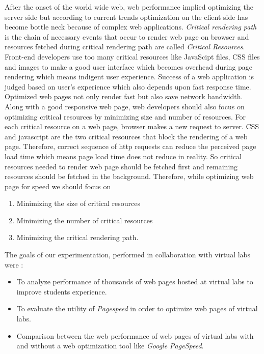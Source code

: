 \documentclass[conference]{IEEEtran}
\begin{document}
After the onset of the world wide web, web performance implied optimizing the
server side but according to current trends
optimization on the client side has become bottle neck because of complex web
applications. 
{\it Critical rendering path} is the chain of necessary events that
occur to render web page on browser and resources fetched during critical rendering path are called 
{\it Critical Resources}\cite{crp}. Front-end developers use too many critical resources like
JavaScipt files, CSS files and images to make a good user interface which becomes
overhead during page rendering which means indigent user experience. Success of a web
application is judged based on user's experience which also depends upon fast response
time. Optimized web pages not only render fast but also save network
bandwidth. Along with a good responsive web page, web developers should
also focus on optimizing critical resources by minimizing size and number of resources.
For each critical resource on a web page, browser makes a new request to server.
CSS and javascript are the two critical resources that block the rendering of a web page.
Therefore, correct sequence of http requests can reduce the perceived page load time which means page
load time does not reduce in reality. So critical resources needed to render web page should be
fetched first and remaining resources should be fetched in the background. Therefore,
while optimizing web page for speed we should focus on \cite{crpo}
\begin{enumerate}
 \item Minimizing the size of critical resources
 \item Minimizing the number of critical resources
 \item Minimizing the critical rendering path.
\end{enumerate}

The goals of our experimentation, performed in collaboration with virtual labs were :

\begin{itemize}
\item To analyze performance of thousands of web pages hosted at virtual labs to improve students experience.
\item To evaluate the utility of {\it Pagespeed} in order to optimize web pages of virtual labs.
\item Comparison between the web performance of web pages of virtual labs with
and without a web optimization tool like {\it Google PageSpeed}.
\end{itemize}
\end{document}
